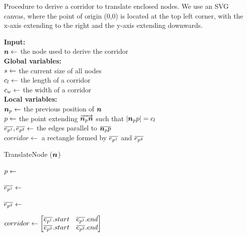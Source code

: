 \begin{algorithm}[tb!]
    \caption{Procedure to derive a corridor to translate enclosed nodes. We use an SVG canvas, where the point of origin (0,0) is located at the top left corner, with the x-axis extending to the right and the y-axis extending downwards.}\label{alg:derive corridor}

    \textbf{Input:} \\
    $ \bm{n} \gets $ the node used to derive the corridor \\

    \textbf{Global variables:} \\
    $ s \gets $ the current size of all nodes \\
    $ c_l \gets $ the length of a corridor \\
    $ c_w \gets $ the width of a corridor \\

    \textbf{Local variables:} \\
    $ \bm{n}_{p} \gets $ the previous position of $ \bm{n} $ \\
    $ p \gets $ the point extending $ \protect\overrightarrow{\bm{n}_{p}\bm{n}} $ such that $ \lvert \bm{n}_{p}p \rvert = c_l $\\
    $ \protect\overline{e_{p^1}}, \protect\overline{e_{p^2}} \gets $ the edges parallel to $ \protect\overline{\bm{n}_{p}p} $ \\
    $ corridor \gets $ a rectangle formed by $ \protect\overline{e_{p^1}} $ and $ \protect\overline{e_{p^2}} $ \\

    \begin{algorithmic}[1]
            \State TranslateNode ($ \bm{n} $)

            \State $ p \gets $ 

            \State $ \protect\overline{e_{p^1}} \gets $ 

            \State $ \protect\overline{e_{p^2}} \gets $ 

            \State $ corridor \gets
                \begin{bmatrix}
                    \EdgeParallelA.start &
                    \EdgeParallelA.end \\

                    \EdgeParallelB.start &
                    \EdgeParallelB.end \\
                \end{bmatrix} $


\end{algorithmic}
\end{algorithm}
